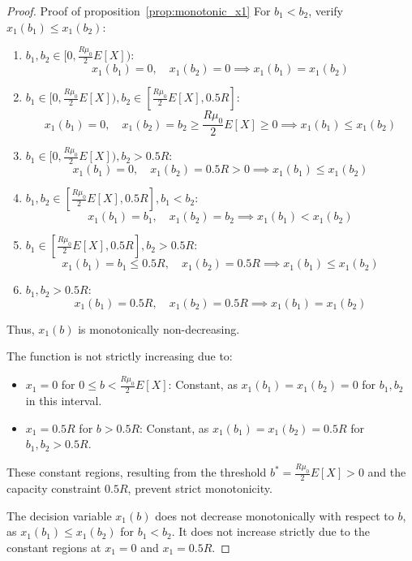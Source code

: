 \documentclass[opre,sglanonrev]{informs4}
\begin{document}
\begin{proof}{Proof of proposition~\ref{prop:monotonic_x1}}
For \( b_1 < b_2 \), verify \( x_1(b_1) \leq x_1(b_2) \):
\begin{enumerate}
    \item \textbf{\( b_1, b_2 \in [0, \frac{R \mu_0}{2} E[X]) \)}:
    \[
    x_1(b_1) = 0, \quad x_1(b_2) = 0 \implies x_1(b_1) = x_1(b_2)
    \]
    \item \textbf{\( b_1 \in [0, \frac{R \mu_0}{2} E[X]), b_2 \in [\frac{R \mu_0}{2} E[X], 0.5R] \)}:
    \[
    x_1(b_1) = 0, \quad x_1(b_2) = b_2 \geq \frac{R \mu_0}{2} E[X] \geq 0 \implies x_1(b_1) \leq x_1(b_2)
    \]
    \item \textbf{\( b_1 \in [0, \frac{R \mu_0}{2} E[X]), b_2 > 0.5R \)}:
    \[
    x_1(b_1) = 0, \quad x_1(b_2) = 0.5R > 0 \implies x_1(b_1) \leq x_1(b_2)
    \]
    \item \textbf{\( b_1, b_2 \in [\frac{R \mu_0}{2} E[X], 0.5R], b_1 < b_2 \)}:
    \[
    x_1(b_1) = b_1, \quad x_1(b_2) = b_2 \implies x_1(b_1) < x_1(b_2)
    \]
    \item \textbf{\( b_1 \in [\frac{R \mu_0}{2} E[X], 0.5R], b_2 > 0.5R \)}:
    \[
    x_1(b_1) = b_1 \leq 0.5R, \quad x_1(b_2) = 0.5R \implies x_1(b_1) \leq x_1(b_2)
    \]
    \item \textbf{\( b_1, b_2 > 0.5R \)}:
    \[
    x_1(b_1) = 0.5R, \quad x_1(b_2) = 0.5R \implies x_1(b_1) = x_1(b_2)
    \]
\end{enumerate}
Thus, \( x_1(b) \) is monotonically non-decreasing.

The function is not strictly increasing due to:
\begin{itemize}
    \item \( x_1 = 0 \) for \( 0 \leq b < \frac{R \mu_0}{2} E[X] \): Constant, as \( x_1(b_1) = x_1(b_2) = 0 \) for \( b_1, b_2 \) in this interval.
    \item \( x_1 = 0.5R \) for \( b > 0.5R \): Constant, as \( x_1(b_1) = x_1(b_2) = 0.5R \) for \( b_1, b_2 > 0.5R \).
\end{itemize}
These constant regions, resulting from the threshold \( b^* = \frac{R \mu_0}{2} E[X] > 0 \) and the capacity constraint \( 0.5R \), prevent strict monotonicity.

The decision variable \( x_1(b) \) does not decrease monotonically with respect to \( b \), as \( x_1(b_1) \leq x_1(b_2) \) for \( b_1 < b_2 \). It does not increase strictly due to the constant regions at \( x_1 = 0 \) and \( x_1 = 0.5R \).
\end{proof}
\end{document}
